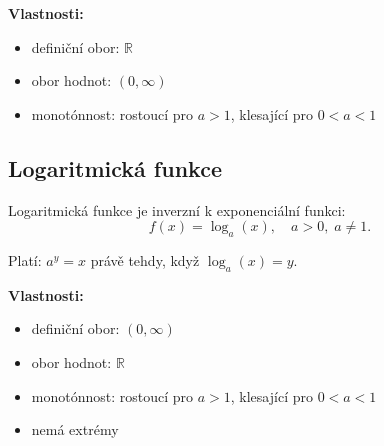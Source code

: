 \documentclass[openany,12pt,a4paper]{book}
\begin{document}
\textbf{Vlastnosti:}
\begin{itemize}
  \item definiční obor: $\mathbb{R}$
  \item obor hodnot: $(0, \infty)$
  \item monotónnost: rostoucí pro $a>1$, klesající pro $0<a<1$
\end{itemize}

\begin{center}
\end{center}

\subsection*{Logaritmická funkce}
\begin{definition}
Logaritmická funkce je inverzní k exponenciální funkci:
\[
f(x) = \log_a(x), \quad a > 0, \; a \neq 1.
\]

Platí: $a^y = x$ právě tehdy, když $\log_a(x) = y$.
\end{definition}

\textbf{Vlastnosti:}
\begin{itemize}
  \item definiční obor: $(0, \infty)$
  \item obor hodnot: $\mathbb{R}$
  \item monotónnost: rostoucí pro $a>1$, klesající pro $0<a<1$
  \item nemá extrémy
\end{itemize}

\begin{center}
\end{center}
\end{document}
